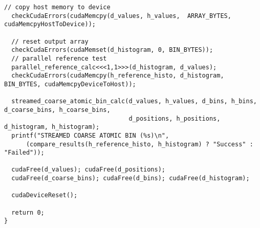 \begin{lstlisting}[captionpos=t, xleftmargin=0.0pt, xrightmargin=0.0pt, caption={Coarse Histogram implementation}, label={lst:coarse histogram impl}]
  // copy host memory to device
  checkCudaErrors(cudaMemcpy(d_values, h_values,  ARRAY_BYTES, cudaMemcpyHostToDevice));

  // reset output array
  checkCudaErrors(cudaMemset(d_histogram, 0, BIN_BYTES));
  // parallel reference test
  parallel_reference_calc<<<1,1>>>(d_histogram, d_values);
  checkCudaErrors(cudaMemcpy(h_reference_histo, d_histogram,  BIN_BYTES, cudaMemcpyDeviceToHost));

  streamed_coarse_atomic_bin_calc(d_values, h_values, d_bins, h_bins, d_coarse_bins, h_coarse_bins, 
                                  d_positions, h_positions, d_histogram, h_histogram);
  printf("STREAMED COARSE ATOMIC BIN (%s)\n", 
      (compare_results(h_reference_histo, h_histogram) ? "Success" : "Failed"));

  cudaFree(d_values); cudaFree(d_positions);
  cudaFree(d_coarse_bins); cudaFree(d_bins); cudaFree(d_histogram);

  cudaDeviceReset();

  return 0;
}

\end{lstlisting}
